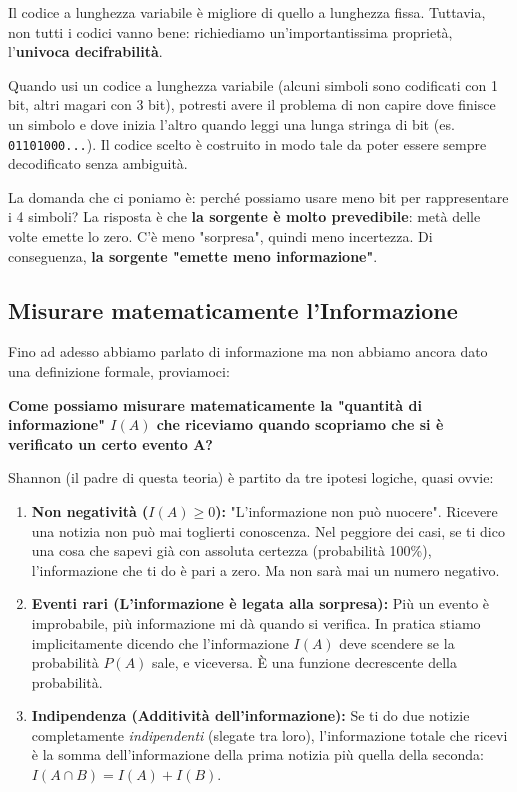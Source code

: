 Il codice a lunghezza variabile è migliore di quello a lunghezza fissa. Tuttavia, non tutti i codici vanno bene: richiediamo un'importantissima proprietà, l'\textbf{univoca decifrabilità}.

Quando usi un codice a lunghezza variabile (alcuni simboli sono codificati con 1 bit, altri magari con 3 bit), potresti avere il problema di non capire dove finisce un simbolo e dove inizia l'altro quando leggi una lunga stringa di bit (es. \texttt{01101000...}). Il codice scelto è costruito in modo tale da poter essere sempre decodificato senza ambiguità.

La domanda che ci poniamo è: perché possiamo usare meno bit per rappresentare i 4 simboli?
La risposta è che \textbf{la sorgente è molto prevedibile}: metà delle volte emette lo zero. C'è meno "sorpresa", quindi meno incertezza. Di conseguenza, \textbf{la sorgente "emette meno informazione"}.

\subsection{Misurare matematicamente l'Informazione}

Fino ad adesso abbiamo parlato di informazione ma non abbiamo ancora dato una definizione formale, proviamoci:

\textbf{Come possiamo misurare matematicamente la "quantità di informazione" $I(A)$ che riceviamo quando scopriamo che si è verificato un certo evento A?}

Shannon (il padre di questa teoria) è partito da tre ipotesi logiche, quasi ovvie:

\begin{enumerate}
    \item \textbf{Non negatività ($I(A) \ge 0$):} "L'informazione non può nuocere". Ricevere una notizia non può mai toglierti conoscenza. Nel peggiore dei casi, se ti dico una cosa che sapevi già con assoluta certezza (probabilità 100\%), l'informazione che ti do è pari a zero. Ma non sarà mai un numero negativo.
    
    \item \textbf{Eventi rari (L'informazione è legata alla sorpresa):} Più un evento è improbabile, più informazione mi dà quando si verifica. In pratica stiamo implicitamente dicendo che l'informazione $I(A)$ deve scendere se la probabilità $P(A)$ sale, e viceversa. È una funzione decrescente della probabilità.
    
    \item \textbf{Indipendenza (Additività dell'informazione):} Se ti do due notizie completamente \textit{indipendenti} (slegate tra loro), l'informazione totale che ricevi è la somma dell'informazione della prima notizia più quella della seconda: $I(A \cap B) = I(A) + I(B)$.
\end{enumerate}


